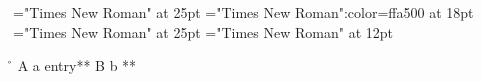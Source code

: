 \font\entryletHeaddiv="Times New Roman" at 25pt
\font{}="Times New Roman":color=ffa500 at 18pt
\font{}="Times New Roman" at 25pt
\font\div="Times New Roman" at 12pt
 \r\n
{} A a
\entryletHeaddiv entry**
 B b
**


\bye
